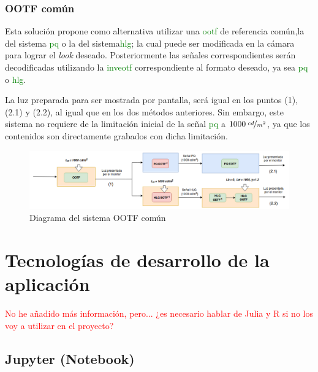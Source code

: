 \documentclass[a4paper, 12pt]{report}
\begin{document}
\subsection{OOTF común}
\label{subsec:ootf_common}

Esta solución propone como alternativa utilizar una \textcolor{green}{ootf} de referencia común,la del sistema \textcolor{green}{pq} o la del sistema\textcolor{green}{hlg}; la cual puede ser modificada en la cámara para lograr el \textit{look} deseado.
Posteriormente las señales correspondientes serán decodificadas utilizando la \textcolor{green}{inveotf} correspondiente al formato deseado, ya sea \textcolor{green}{pq} o \textcolor{green}{hlg}.

La luz preparada para ser mostrada por pantalla, será igual en los puntos (1), (2.1) y (2.2), al igual que en los dos métodos anteriores.
Sin embargo, este sistema no requiere de la limitación inicial de la señal \textcolor{green}{pq} a $1000\: \nicefrac{cd}{m^{2}}$, ya que los contenidos son directamente grabados con dicha limitación.

\begin{figure}[H]
    \centering
    \includegraphics[width=16cm, keepaspectratio]{img/4_Formatos_de_TV_HDR/4_6_Conversiones_entre_Formatos_HDR/4_6_3_OOTF_comun/1_common_ootf.png}
    \caption{Diagrama del sistema OOTF común}
    \label{fig:ootf_common_diag}
\end{figure}


\cleardoublepage
\chapter{Tecnologías de desarrollo de la aplicación}
\textcolor{red}{No he añadido más información, pero... ¿es necesario hablar de Julia y R si no los voy a utilizar en el proyecto?}
\section{Jupyter (Notebook)}
\label{sec:Jupyter}
\end{document}
